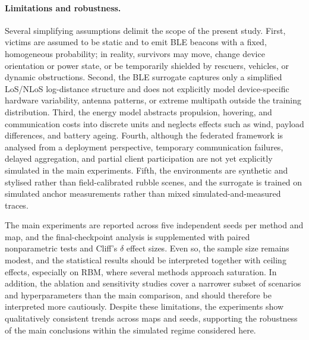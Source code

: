 \documentclass[drones,article,accept,pdftex,moreauthors]{Definitions/mdpi}
\begin{document}
\paragraph{Limitations and robustness.}
Several simplifying assumptions delimit the scope of the present study.
First, victims are assumed to be static and to emit BLE beacons with a fixed,
homogeneous probability; in reality, survivors may move, change device
orientation or power state, or be temporarily shielded by rescuers, vehicles, or
dynamic obstructions. Second, the BLE surrogate captures only a simplified
LoS/NLoS log-distance structure and does not explicitly model device-specific
hardware variability, antenna patterns, or extreme multipath outside the
training distribution. Third, the energy model abstracts propulsion, hovering,
and communication costs into discrete units and neglects effects such as wind,
payload differences, and battery ageing. Fourth, although the federated
framework is analysed from a deployment perspective, temporary communication
failures, delayed aggregation, and partial client participation are not yet
explicitly simulated in the main experiments. Fifth, the environments are
synthetic and stylised rather than field-calibrated rubble scenes, and the
surrogate is trained on simulated anchor measurements rather than mixed
simulated-and-measured traces.

The main experiments are reported across five independent seeds per method and
map, and the final-checkpoint analysis is supplemented with paired
nonparametric tests and Cliff's $\delta$ effect sizes. Even so, the sample size
remains modest, and the statistical results should be interpreted together with
ceiling effects, especially on RBM, where several methods approach saturation.
In addition, the ablation and sensitivity studies cover a narrower subset of
scenarios and hyperparameters than the main comparison, and should therefore be
interpreted more cautiously. Despite these limitations, the experiments show
qualitatively consistent trends across maps and seeds, supporting the robustness
of the main conclusions within the simulated regime considered here.
\end{document}
